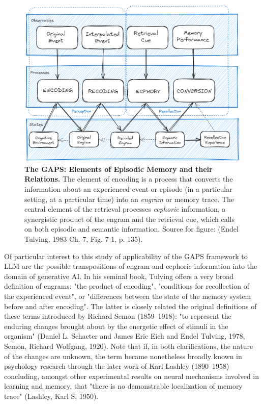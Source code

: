 \documentclass[11pt]{article}
\begin{document}
\begin{figure}[htbp]
\centering
\includegraphics[width=.9\linewidth]{ElementsOfRemembering-rev.png}
\caption{\label{fig:org2061eec}\textbf{The GAPS: Elements of Episodic Memory and their Relations.} The element of encoding is a process that converts the information about an experienced event or episode (in a particular setting, at a particular time) into an \emph{engram} or memory trace. The central element of the retrieval processes \emph{ecphoric} information, a synergistic product of the engram and the retrieval cue, which calls on both episodic and semantic information. Source for figure: (Endel Tulving, 1983 Ch. 7, Fig. 7-1, p. 135).}
\end{figure}

Of particular interest to this study of applicability of the GAPS framework to LLM are the possible transpositions of engram and ecphoric information into the domain of generative AI. In his seminal book, Tulving offers a very broad definition of engrams: "the product of encoding", "conditions for recollection of the experienced event", or "differences between the state of the memory system before and after encoding". The latter is closely related the original definitions of these terms introduced by Richard Semon (1859--1918): "to represent the enduring changes brought about by the energetic effect of stimuli in the organism" (Daniel L. Schacter and James Eric Eich and Endel Tulving, 1978, Semon, Richard Wolfgang, 1920). Note that if, in both clarifications, the nature of the changes are unknown, the term became nonetheless broadly known in psychology research through the later work of Karl Lashley (1890--1958) concluding, amongst other experimental results on neural mechanisms involved in learning and memory, that "there is no demonstrable localization of memory trace" (Lashley, Karl S, 1950).
\end{document}
